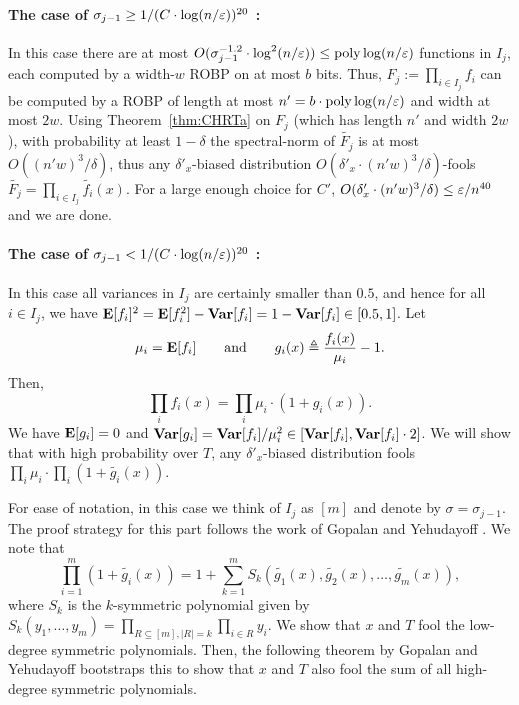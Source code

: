 \paragraph{The case of $\sigma_{j-1} \ge 1/ (C \cdot \log(n/\varepsilon))^{20}$ :}
In this case there are at most $O(\sigma_{j-1}^{-1.2}\cdot \log^2(n/\varepsilon)) \le {\mathrm{poly}}\log(n/\varepsilon)$ functions in $I_j$, each computed by a width-$w$ ROBP on at most $b$ bits. Thus, $F_j := \prod_{i\in I_j} f_i$ can be computed by a ROBP of length at most $n' = b\cdot {\mathrm{poly}}\log(n/\varepsilon)$ and width at most $2w$. 
Using Theorem~\ref{thm:CHRTa} on $F_j$ (which has length $n'$ and width $2w$), with probability at least $1-\delta$ the spectral-norm of $\tilde{F_j}$ is at most $O((n' w)^3/\delta)$, thus any $\delta'_x$-biased distribution $O(\delta'_x \cdot (n' w)^3/\delta)$-fools  $\tilde{F_j} = \prod_{i \in I_j}{\tilde{f_i}(x)}$. For a large enough choice for $C'$, $O(\delta'_x \cdot (n' w)^3/\delta) \le \varepsilon/n^{40}$ and we are done. 


\paragraph{The case of $\sigma_{j-1} < 1/ (C \cdot \log(n/\varepsilon))^{20}$ :}
In this case all variances in $I_j$ are certainly smaller than $0.5$, and hence for all $i\in I_j$, we have $\mathop{\bf E\/}[f_i]^2 = \mathop{\bf E\/}[f_i^2]-{\mathop{\bf Var\/}}[f_i] = 1-{\mathop{\bf Var\/}}[f_i] \in [0.5,1]$.
Let $$\mu_i = \mathop{\bf E\/}[f_i]\qquad\text{and}\qquad g_i(x) \triangleq \frac{f_i(x)}{\mu_i} - 1.$$
Then, $$\prod_{i}{f_i(x)} = \prod_{i}{\mu_i} \cdot (1+g_i(x)).$$
We have $\mathop{\bf E\/}[g_i] = 0$ and $\mathop{\bf Var\/}[g_i] = \mathop{\bf Var\/}[f_i]/\mu_i^2 \in [{\mathop{\bf Var\/}}[f_i], {\mathop{\bf Var\/}}[f_i] \cdot 2]$.
We will show that with high probability over $T$, any $\delta'_x$-biased distribution fools $\prod_{i}{\mu_i} \cdot \prod_{i}{(1+\tilde{g_i}(x))}$. 

For ease of notation, in this case we think of $I_j$ as $[m]$ and denote by $\sigma = \sigma_{j-1}$.
The proof strategy for this part follows the work of Gopalan and Yehudayoff \cite{GopalanY14}. 
We note that 
$$\prod_{i=1}^{m}{(1+\tilde{g_i}(x))} = 1+\sum_{k=1}^{m} S_k(\tilde{g_1}(x), \tilde{g_2}(x), \ldots, \tilde{g_{m}}(x)),$$ 
where $S_k$ is the $k$-symmetric polynomial given by $S_k(y_1, \ldots, y_m) = \prod_{R \subseteq [m], |R|=k}{\prod_{i \in R} y_i}$.
We show that $x$ and $T$ fool the low-degree symmetric polynomials. Then, the following theorem by Gopalan and Yehudayoff \cite{GopalanY14} bootstraps this to show that $x$ and $T$ also fool the sum of all high-degree symmetric polynomials.

